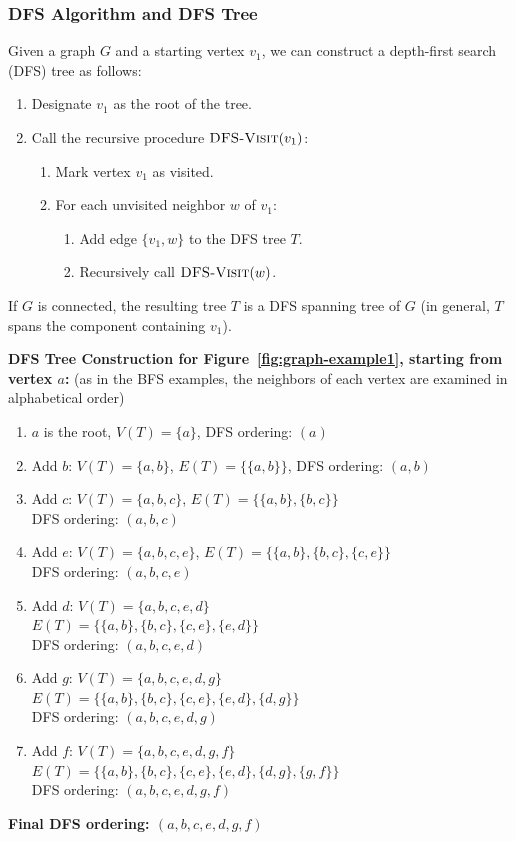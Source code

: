 \documentclass{article}
\theoremstyle{definition}
\begin{document}
\subsubsection{DFS Algorithm and DFS Tree}
Given a graph $G$ and a starting vertex $v_1$, we can construct a depth-first search (DFS) tree as follows:
\begin{enumerate}
\item Designate $v_1$ as the root of the tree.
\item Call the recursive procedure $\textsc{DFS-Visit}(v_1)$:
   \begin{enumerate}
   \item Mark vertex $v_1$ as visited.
   \item For each unvisited neighbor $w$ of $v_1$:
      \begin{enumerate}
      \item Add edge $\{v_1,w\}$ to the DFS tree $T$.
      \item Recursively call $\textsc{DFS-Visit}(w)$.
      \end{enumerate}
   \end{enumerate}
\end{enumerate}
If $G$ is connected, the resulting tree $T$ is a DFS spanning tree of $G$ (in general, $T$ spans the component containing $v_1$).

\noindent\textbf{DFS Tree Construction for Figure~\ref{fig:graph-example1}, starting from vertex $a$:} (as in the BFS examples, the neighbors of each vertex are examined in alphabetical order)
\begin{enumerate}
\item $a$ is the root, $V(T) = \{a\}$, DFS ordering: $(a)$
\item Add $b$: $V(T) = \{a, b\}$, $E(T) = \{\{a, b\}\}$, DFS ordering: $(a, b)$
\item Add $c$: $V(T) = \{a, b, c\}$, $E(T) = \{\{a, b\}, \{b, c\}\}$\\
   DFS ordering: $(a, b, c)$
\item Add $e$: $V(T) = \{a, b, c, e\}$, $E(T) = \{\{a, b\}, \{b, c\}, \{c, e\}\}$\\
   DFS ordering: $(a, b, c, e)$
\item Add $d$: $V(T) = \{a, b, c, e, d\}$\\
   $E(T) = \{\{a, b\}, \{b, c\}, \{c, e\}, \{e, d\}\}$\\
   DFS ordering: $(a, b, c, e, d)$
\item Add $g$: $V(T) = \{a, b, c, e, d, g\}$\\
   $E(T) = \{\{a, b\}, \{b, c\}, \{c, e\}, \{e, d\}, \{d, g\}\}$\\
   DFS ordering: $(a, b, c, e, d, g)$
\item Add $f$: $V(T) = \{a, b, c, e, d, g, f\}$\\
   $E(T) = \{\{a, b\}, \{b, c\}, \{c, e\}, \{e, d\}, \{d, g\}, \{g, f\}\}$\\
   DFS ordering: $(a, b, c, e, d, g, f)$
\end{enumerate}
\textbf {Final DFS ordering: $(a, b, c, e, d, g, f)$}
\end{document}

